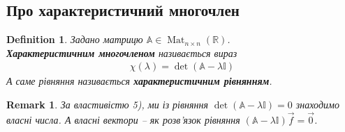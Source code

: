 \documentclass[a4paper, 10pt]{article}
\theoremstyle{theoremdd}
\newtheorem{definition}[theorem]{Definition}
\newtheorem{remark}[theorem]{Remark}
\DeclareMathOperator{\Mat}{Mat}
\begin{document}
\subsection{Про характеристичний многочлен}
\begin{definition}
Задано матрицю $\mathbb{A} \in \Mat_{n \times n}(\mathbb{R})$.\\
\textbf{Характеристичним многочленом} називається вираз
\begin{align*}
\chi(\lambda) = \det(\mathbb{A} - \lambda \mathbb{I})
\end{align*}
А саме рівняння називається \textbf{характеристичним рівнянням}.
\end{definition}

\begin{remark}
За властивістю 5), ми із рівняння $\det (\mathbb{A} - \lambda \mathbb{I}) = 0$ знаходимо власні числа. А власні вектори -- як розв'язок рівняння $(\mathbb{A} - \lambda \mathbb{I})\vec{f} = \vec{0}$.
\end{remark}
\end{document}
